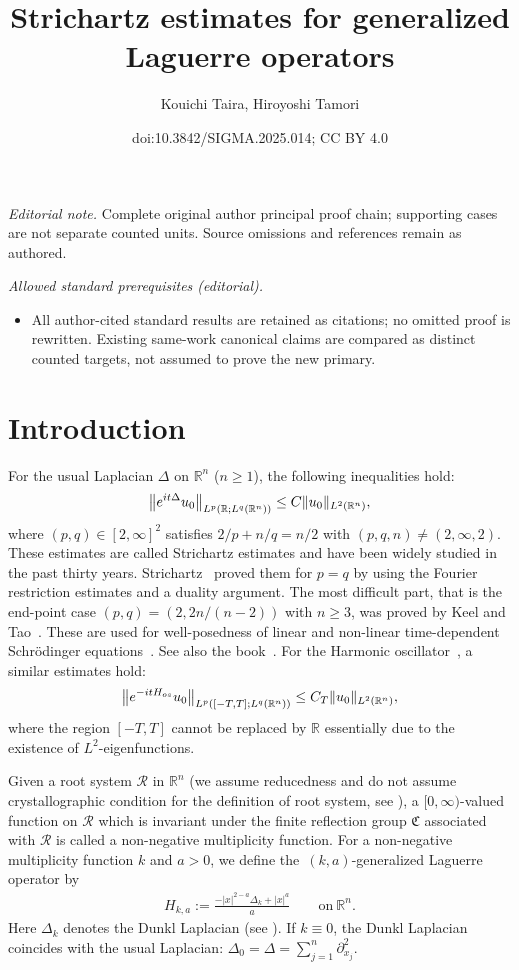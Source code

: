 \documentclass[10pt,a4paper]{article}
\title{Strichartz estimates for generalized Laguerre operators}
\author{Kouichi Taira, Hiroyoshi Tamori}
\date{doi:10.3842/SIGMA.2025.014; CC BY 4.0}
\numberwithin{equation}{section}
\def\R{\mathbb{R}}%
\def\pa{\partial}
\newcommand{\cR}{\mathcal{R}}
\begin{document}
\maketitle
\noindent\textit{Editorial note.} Complete original author principal proof chain; supporting cases are not separate counted units. Source omissions and references remain as authored.\par\medskip
\noindent\textit{Allowed standard prerequisites (editorial).}\begin{itemize}
\item All author-cited standard results are retained as citations; no omitted proof is rewritten. Existing same-work canonical claims are compared as distinct counted targets, not assumed to prove the new primary.
\end{itemize}\medskip
\section{Introduction}

For the usual Laplacian $\Delta$ on $\R^n$ ($n\ge 1$), the following inequalities hold:
\begin{align*}
\big\|{\rm e}^{{\rm i}t\Delta}u_0\big\|_{L^p(\R;L^q(\R^n))}\leq C\|u_0\|_{L^2(\R^n)},
\end{align*}
where $(p,q)\in [2,\infty]^2$ satisfies $2/p+n/q=n/2$ with $(p,q,n)\neq (2,\infty,2)$. These estimates are called Strichartz estimates and have been widely studied in the past thirty years. Strichartz~\cite{St} proved them for $p=q$ by using the Fourier restriction estimates and a duality argument. The most difficult part, that is the end-point case $(p,q)=(2,2n/(n-2))$ with $n\geq 3$, was proved by Keel and Tao~\cite{KT}.
These are used for well-posedness of linear and non-linear time-dependent Schr\"odinger equations~\cite{GV,Y}. See also the book~\cite{T}. For the Harmonic oscillator~, a similar estimates hold:
\[
\big\|{\rm e}^{-{\rm i}tH_{\rm os}}u_0\big\|_{L^p([-T,T];L^q(\R^n))}\leq C_T\|u_0\|_{L^2(\R^n)},
\]
 where the region $[-T,T]$ cannot be replaced by $\R$ essentially due to the existence of $L^2$-eigenfunctions.

Given a root system $\cR$ in $\R^n$ (we assume reducedness and do not assume crystallographic condition for the definition of root system, see \cite[Definition~2.1]{BKO}), a $[0,\infty)$-valued function on $\cR$ which is invariant under the finite reflection group $\mathfrak{C}$ associated with $\cR$ is called a non-negative multiplicity function.
For a non-negative multiplicity function $k$ and $a>0$, we define the~$(k,a)$-generalized Laguerre operator by
\begin{align*}
H_{k,a}:=\frac{-|x|^{2-a}\Delta_k+|x|^a}{a}\qquad \text{on} \ \R^n.
\end{align*}
Here $\Delta_k$ denotes the Dunkl Laplacian (see \cite[formula~(2.9)]{BKO}).
If $k\equiv 0$, the Dunkl Laplacian coincides with the usual Laplacian: $\Delta_0=\Delta=\sum_{j=1}^n\pa_{x_j}^2$.
\end{document}
